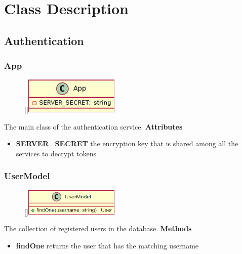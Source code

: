 \section{Class Description}

\subsection{Authentication}
\subsubsection{App}
\label{App}
\begin{figure}
    \raisebox{0pt}[\dimexpr{}\baselineskip\relax]{\includegraphics[width=4.5cm]{classes/auth/app.png}}
\end{figure} 
\par
The main class of the authentication service.
\newline
\newline
\textbf{Attributes}
\begin{itemize}
    \item \textbf{SERVER\_SECRET} the encryption key that is shared among all the services to decrypt tokens
\end{itemize}

\subsubsection{UserModel}
\label{UserModel}
\begin{figure}
    \raisebox{0pt}[\dimexpr{}\baselineskip\relax]{\includegraphics[width=4.5cm]{classes/auth/1.png}}
\end{figure} 
\par
The collection of registered users in the database.
\newline
\newline
\textbf{Methods}
\begin{itemize}
    \item \textbf{findOne} returns the user that has the matching username
\end{itemize}


